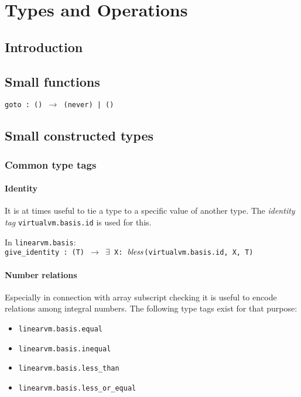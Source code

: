 \documentclass[a4paper]{book}
\newcommand\tyBless{{\ensuremath{\textnormal{\textit{bless}}}}}
\begin{document}

\part{Types and Operations}

\chapter{Introduction}
\chapter{Small functions}

\texttt{goto : () $\to$ (never) | ()}

\chapter{Small constructed types}

\section{Common type tags}

\subsection*{Identity}
It is at times useful to tie a type to a specific value of another type.
The \emph{identity tag} \texttt{virtualvm.basis.id} is used for this.

In \texttt{linearvm.basis}:\\
\texttt{give\_identity : (T) $\to$ $\exists$ X: \tyBless(virtualvm.basis.id, X, T)}

\subsection*{Number relations}
Especially in connection with array subscript checking it is useful to encode
relations among integral numbers.
The following type tags exist for that purpose:

\begin{itemize}
\item \texttt{linearvm.basis.equal}
\item \texttt{linearvm.basis.inequal}
\item \texttt{linearvm.basis.less\_than}
\item \texttt{linearvm.basis.less\_or\_equal}
\end{itemize}
\end{document}
